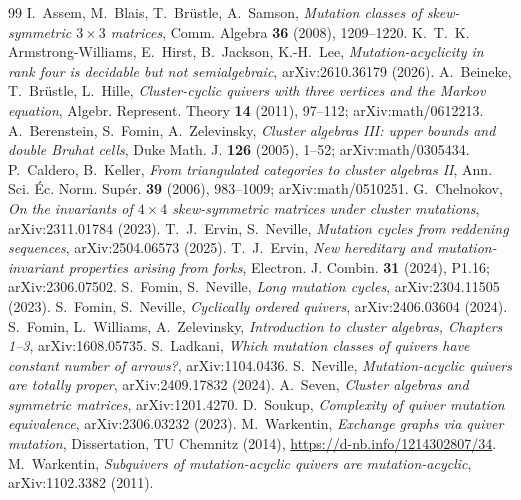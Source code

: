 \documentclass[11pt]{amsart}
\theoremstyle{definition}
\theoremstyle{remark}
\begin{document}
\begin{thebibliography}{99}
 I.~Assem, M.~Blais, T.~Br\"ustle, A.~Samson, \emph{Mutation classes of skew-symmetric $3\times3$ matrices}, Comm. Algebra \textbf{36} (2008), 1209--1220.
 K.~T.~K. Armstrong-Williams, E.~Hirst, B.~Jackson, K.-H.~Lee, \emph{Mutation-acyclicity in rank four is decidable but not semialgebraic}, arXiv:2610.36179 (2026).
 A.~Beineke, T.~Br\"ustle, L.~Hille, \emph{Cluster-cyclic quivers with three vertices and the Markov equation}, Algebr. Represent. Theory \textbf{14} (2011), 97--112; arXiv:math/0612213.
 A.~Berenstein, S.~Fomin, A.~Zelevinsky, \emph{Cluster algebras III: upper bounds and double Bruhat cells}, Duke Math. J. \textbf{126} (2005), 1--52; arXiv:math/0305434.
 P.~Caldero, B.~Keller, \emph{From triangulated categories to cluster algebras II}, Ann. Sci. \'Ec. Norm. Sup\'er. \textbf{39} (2006), 983--1009; arXiv:math/0510251.
 G.~Chelnokov, \emph{On the invariants of $4\times4$ skew-symmetric matrices under cluster mutations}, arXiv:2311.01784 (2023).
 T.~J.~Ervin, S.~Neville, \emph{Mutation cycles from reddening sequences}, arXiv:2504.06573 (2025).
 T.~J.~Ervin, \emph{New hereditary and mutation-invariant properties arising from forks}, Electron. J. Combin. \textbf{31} (2024), P1.16; arXiv:2306.07502.
 S.~Fomin, S.~Neville, \emph{Long mutation cycles}, arXiv:2304.11505 (2023).
 S.~Fomin, S.~Neville, \emph{Cyclically ordered quivers}, arXiv:2406.03604 (2024).
 S.~Fomin, L.~Williams, A.~Zelevinsky, \emph{Introduction to cluster algebras, Chapters 1--3}, arXiv:1608.05735.
 S.~Ladkani, \emph{Which mutation classes of quivers have constant number of arrows?}, arXiv:1104.0436.
 S.~Neville, \emph{Mutation-acyclic quivers are totally proper}, arXiv:2409.17832 (2024).
 A.~Seven, \emph{Cluster algebras and symmetric matrices}, arXiv:1201.4270.
 D.~Soukup, \emph{Complexity of quiver mutation equivalence}, arXiv:2306.03232 (2023).
 M.~Warkentin, \emph{Exchange graphs via quiver mutation}, Dissertation, TU Chemnitz (2014), \url{https://d-nb.info/1214302807/34}.
 M.~Warkentin, \emph{Subquivers of mutation-acyclic quivers are mutation-acyclic}, arXiv:1102.3382 (2011).
\end{thebibliography}
\end{document}
